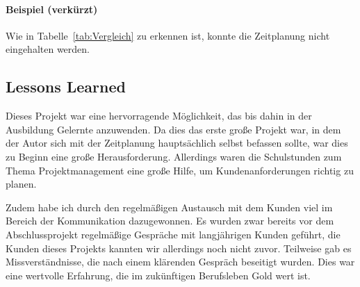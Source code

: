 \paragraph{Beispiel (verkürzt)}
Wie in Tabelle~\ref{tab:Vergleich} zu erkennen ist, konnte die Zeitplanung nicht eingehalten werden.


\subsection{Lessons Learned}
\label{sec:LessonsLearned}

Dieses Projekt war eine hervorragende Möglichkeit, das bis dahin in der Ausbildung Gelernte anzuwenden.
Da dies das erste große Projekt war, in dem der Autor sich mit der Zeitplanung hauptsächlich selbst befassen sollte, war dies zu Beginn eine große Herausforderung.
Allerdings waren die Schulstunden zum Thema Projektmanagement eine große Hilfe, um Kundenanforderungen richtig zu planen.

Zudem habe ich durch den regelmäßigen Austausch mit dem Kunden viel im Bereich der Kommunikation dazugewonnen.
Es wurden zwar bereits vor dem Abschlussprojekt regelmäßige Gespräche mit langjährigen Kunden geführt, die Kunden dieses Projekts kannten wir allerdings noch nicht zuvor.
Teilweise gab es Missverständnisse, die nach einem klärenden Gespräch beseitigt wurden.
Dies war eine wertvolle Erfahrung, die im zukünftigen Berufsleben Gold wert ist.
